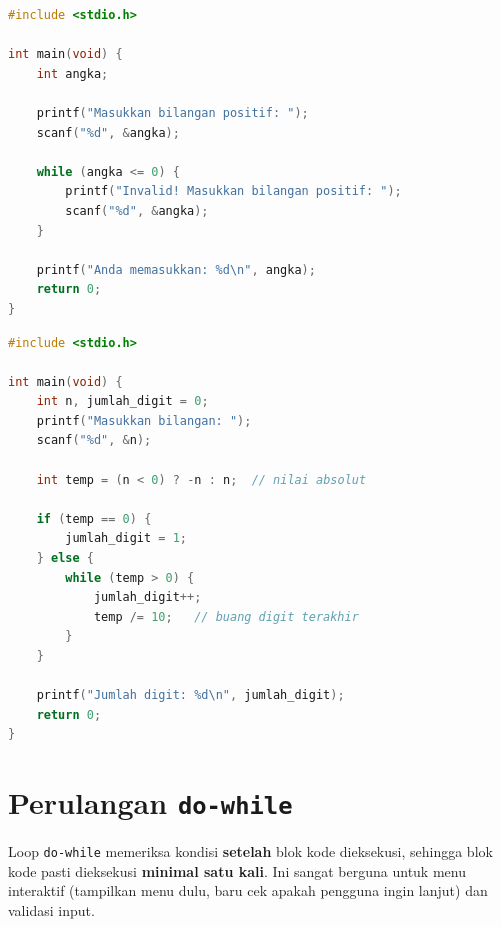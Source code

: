 \documentclass[../main.tex]{subfiles}
\begin{document}
\begin{lstlisting}[language=C,caption=Loop \texttt{while} --- validasi input]
#include <stdio.h>

int main(void) {
    int angka;
    
    printf("Masukkan bilangan positif: ");
    scanf("%d", &angka);
    
    while (angka <= 0) {
        printf("Invalid! Masukkan bilangan positif: ");
        scanf("%d", &angka);
    }
    
    printf("Anda memasukkan: %d\n", angka);
    return 0;
}
\end{lstlisting}

\begin{lstlisting}[language=C,caption=Menghitung jumlah digit]
#include <stdio.h>

int main(void) {
    int n, jumlah_digit = 0;
    printf("Masukkan bilangan: ");
    scanf("%d", &n);
    
    int temp = (n < 0) ? -n : n;  // nilai absolut
    
    if (temp == 0) {
        jumlah_digit = 1;
    } else {
        while (temp > 0) {
            jumlah_digit++;
            temp /= 10;   // buang digit terakhir
        }
    }
    
    printf("Jumlah digit: %d\n", jumlah_digit);
    return 0;
}
\end{lstlisting}



\section{Perulangan \texttt{do-while}}

Loop \texttt{do-while} memeriksa kondisi \textbf{setelah} blok kode dieksekusi, sehingga blok kode pasti dieksekusi \textbf{minimal satu kali}. Ini sangat berguna untuk menu interaktif (tampilkan menu dulu, baru cek apakah pengguna ingin lanjut) dan validasi input.
\end{document}

